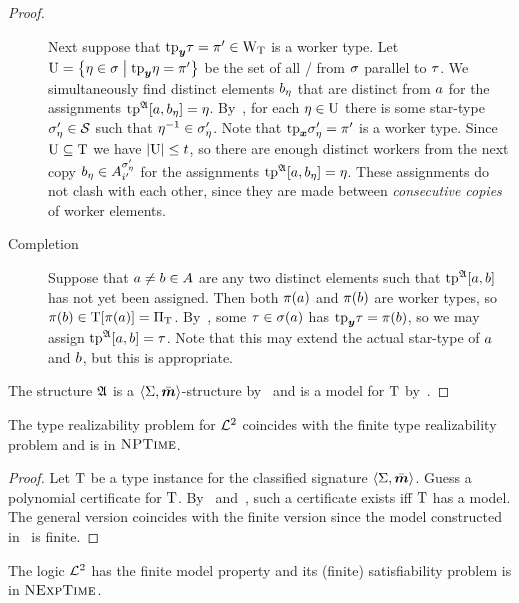 \begin{proof}
\begin{description}
  Next suppose that $\mathrm{tp}_{\bm{y}}\tau = {\pi'} \in {\mathrm{W}}_{\mathrm{T}}$ is a worker type.
  Let $\mathrm{U} = \left\{\eta\in\sigma\mathrel{}\middle|\mathrel{}\mathrm{tp}_{\bm{y}}\eta = {\pi'}\right\}$ be the set of all
  \twotypes/ from $\sigma$ parallel to $\tau$.
  We simultaneously find distinct elements $b_{\eta}$ that are distinct from
  $a$ for the assignments $\operatorname{tp}^{\mathfrak{A}}[a,b_{\eta}] = \eta$.
  By~, for each
  $\eta\in\mathrm{U}$ there is some star-type ${\sigma_{\eta}'} \in \mathcal{S}$ such that
  $\eta^{-1} \in {\sigma_{\eta}'}$.
  Note that $\mathrm{tp}_{\bm{x}}{\sigma_{\eta}'} = {\pi'}$ is a worker type.
  Since $\mathrm{U}\subseteq\mathrm{T}$ we have $\left|\mathrm{U}\right| \leq t$, so there are enough
  distinct workers from the next copy $b_{\eta} \in A^{{\sigma_{\eta}'}}_{{i'}}$ for
  the assignments $\operatorname{tp}^{\mathfrak{A}}[a,b_{\eta}] = \eta$.
  These assignments do not clash with each other, since they are made between
  \emph{consecutive copies} of worker elements.
  \item[Completion]
  Suppose that $a\neq b \in A$ are any two distinct elements such that
  $\operatorname{tp}^{\mathfrak{A}}[a,b]$ has not yet been assigned. 
  Then both $\pi(a)$ and $\pi(b)$ are worker types, so $\pi(b) \in
  \mathrm{T}[\pi(a)] = {\Pi}_{\mathrm{T}}$.
  By~, some $\tau\in\sigma(a)$ has $\mathrm{tp}_{\bm{y}}\tau = \pi(b)$, so we
  may assign $\operatorname{tp}^{\mathfrak{A}}[a,b] = \tau$.
  Note that this may extend the actual star-type of $a$ and $b$, but this is
  appropriate.
\end{description}
The structure $\mathfrak{A}$ is a $\left\langle \mathrm{\Sigma},\bar{\bm{m}} \right\rangle$-structure by~ and is
a model for $\mathrm{T}$ by~.
\end{proof}

\begin{proposition}\label{prop:tprealiz-1}
The type realizability problem for $\mathcal{L}^{2}$ coincides with the finite type
realizability problem and is in $\text{\normalfont{\scshape NPTime}}$.
\end{proposition}
\begin{proof}
Let $\mathrm{T}$ be a type instance for the classified signature
$\left\langle \mathrm{\Sigma},\bar{\bm{m}} \right\rangle$.
Guess a polynomial certificate for $\mathrm{T}$.
By~ and~, such a certificate exists
iff $\mathrm{T}$ has a model.
The general version coincides with the finite version since the model
constructed in~ is finite.
\end{proof}
\begin{corollary}
The logic $\mathcal{L}^{2}$ has the finite model property and its (finite) satisfiability
problem is in $\text{\normalfont{\scshape NExpTime}}$.
\end{corollary}